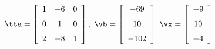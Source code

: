 {$\tta = \left[ \begin {array}{ccc} 1&-6&0\\\noalign{\medskip}0&1&0
\\\noalign{\medskip}2&-8&1\end {array} \right] ,$
 \quad
$\vb = \left[ \begin {array}{c} -69\\\noalign{\medskip}10
\\\noalign{\medskip}-102\end {array} \right]$ 
}
{$\vx = \left[ \begin {array}{c} -9\\\noalign{\medskip}10\\\noalign{\medskip}
-4\end {array} \right]$}
 
